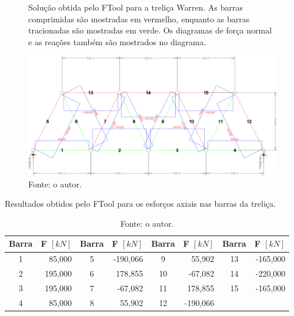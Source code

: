 \documentclass[a4paper, 12pt]{article} %
\def\comprimido{OrangeRed!30}
\def\tracionado{OliveGreen!30}
\begin{document}
\begin{figure}[!ht]
    \centering
    \caption{Solução obtida pelo FTool para a treliça Warren. As barras comprimidas são mostradas em vermelho, enquanto as barras tracionadas são mostradas em verde. Os diagramas de força normal e as reações também são mostrados no diagrama.} 
    \includegraphics[width=\linewidth]{Warren-model-FTool-Solution.png}
    \caption*{Fonte: o autor.}
    \label{fig:warren-ftool}
\end{figure}


\begin{table}[!ht]
    \centering
    \caption{Resultados obtidos pelo FTool para os esforços axiais nas barras da treliça.  }
    \begin{tabular}{cr cr cr cr}
        \hline\hline
        Barra & F $[\unit{kN}]$ & Barra & F $[\unit{kN}]$ & Barra & F $[\unit{kN}]$ & Barra & F $[\unit{kN}]$\\
        \hline\hline
        1 & \colorbox{\tracionado}{85,000}  & 5 & \colorbox{\comprimido}{-190,066}  & 9  &  \colorbox{\tracionado}{55,902} & 13 & \colorbox{\comprimido}{-165,000} \\
        \hline
        2 & \colorbox{\tracionado}{195,000} & 6 &  \colorbox{\tracionado}{178,855}  & 10 & \colorbox{\comprimido}{-67,082} & 14 & \colorbox{\comprimido}{-220,000} \\
        \hline
        3 & \colorbox{\tracionado}{195,000} & 7 &  \colorbox{\comprimido}{-67,082}  & 11 & \colorbox{\tracionado}{178,855} & 15 & \colorbox{\comprimido}{-165,000} \\
        \hline
        4 & \colorbox{\tracionado}{85,000}  & 8 &  \colorbox{\tracionado}{55,902}   & 12 &\colorbox{\comprimido}{-190,066} &   &   \\
        \hline\hline
    \end{tabular}
    \vspace{3mm}
    \caption*{Fonte: o autor.}
    \label{tab:esforços_ftool}
\end{table}
\end{document}
